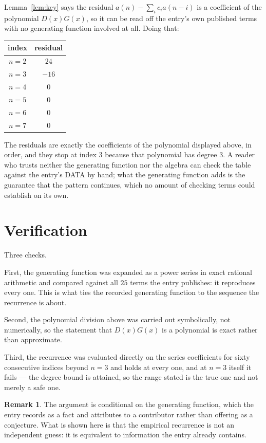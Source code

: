 \documentclass[11pt,a4paper]{article}
\theoremstyle{plain}
\theoremstyle{definition}
\newtheorem{remark}[theorem]{Remark}
\begin{document}
Lemma~\ref{lem:key} says the residual $a(n)-\sum_ic_ia(n-i)$ is a coefficient of the
polynomial $D(x)G(x)$, so it can be read off the entry's own published terms with no
generating function involved at all. Doing that:
\begin{center}
\begin{tabular}{cc}
index & residual \\ \hline
$n=2$ & $24$ \\
$n=3$ & $-16$ \\
$n=4$ & $0$ \\
$n=5$ & $0$ \\
$n=6$ & $0$ \\
$n=7$ & $0$
\end{tabular}
\end{center}
The residuals are exactly the coefficients of the polynomial displayed above, in order, and
they stop at index $3$ because that polynomial has degree $3$. A reader who trusts
neither the generating function nor the algebra can check the table against the entry's DATA
by hand; what the generating function adds is the guarantee that the pattern continues, which
no amount of checking terms could establish on its own.

\section{Verification}

Three checks.

First, the generating function was expanded as a power series in exact rational arithmetic and
compared against all $25$ terms the entry publishes: it reproduces every one. This is
what ties the recorded generating function to the sequence the recurrence is about.

Second, the polynomial division above was carried out symbolically, not numerically, so the
statement that $D(x)G(x)$ is a polynomial is exact rather than approximate.

Third, the recurrence was evaluated directly on the series coefficients for sixty consecutive
indices beyond $n=3$ and holds at every one, and at $n=3$ itself it fails --- the
degree bound is attained, so the range stated is the true one and not merely a safe one.

\begin{remark}
The argument is conditional on the generating function, which the entry records as a fact and
attributes to a contributor rather than offering as a conjecture. What is shown here is that
the empirical recurrence is not an independent guess: it is equivalent to information the
entry already contains.
\end{remark}
\end{document}

